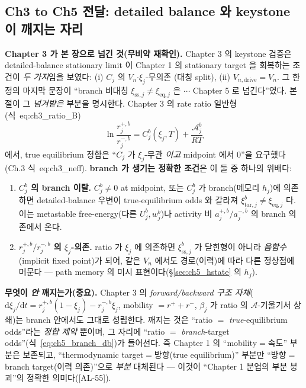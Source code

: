 \documentclass[11pt,a4paper]{article}
\newcommand{\dd}{\mathrm{d}}
\newcommand{\eq}{\mathrm{eq}}
\newcommand{\drive}{\mathrm{drive}}
\newcommand{\tar}{\mathrm{tar}}
\newcommand{\sstat}{\mathrm{ss}}
\newcommand{\AL}[1]{\textsf{[AL-#1]}}
\begin{document}
\subsection{Ch3 to Ch5 전달: detailed balance 와 keystone 이 깨지는 자리}\label{sec:ch5_dbbreak}
\textbf{Chapter 3 가 본 장으로 넘긴 것(무비약 재확인).} Chapter 3 의 keystone 검증은 detailed-balance stationary
limit 이 Chapter 1 의 stationary target 을 회복하는 조건이 \emph{두 가지}임을 보였다: (i) $C_j$ 의 $V_n$$\cdot$$\xi_j$-무의존
(대칭 split), (ii) $V_{n,\drive}=V_n$. 그 한정의 마지막 문장이 ``branch 비대칭 $\xi_{\sstat,j}\ne\xi_{\eq,j}$
은 $\cdots$ Chapter 5 로 넘긴다''였다. 본 절이 그 \emph{넘겨받은} 부분을 명시한다. Chapter 3 의 rate ratio
일반형(식~eq:ch3\_ratio\_B)
\begin{equation}
\ln\frac{r_j^{+,b}}{r_j^{-,b}}=C_j^b(\xi_j,T)+\frac{\mathcal A_j^b}{RT}
\label{eq:ch5_ratio_branch}
\end{equation}
에서, true equilibrium 정합은 ``$C_j$ 가 $\xi_j$-무관 \emph{이고} midpoint 에서 0''을 요구했다(Ch.3
식~eq:ch3\_neff). \textbf{branch 가 생기는 정확한 조건}은 이 둘 중 하나의 위배다:
\begin{enumerate}[label=(\alph*),leftmargin=2.2em]
\item \textbf{$C_j^b$ 의 branch 이탈.} $C_j^b\ne0$ at midpoint, 또는 $C_j^b$ 가 branch(메모리 $h_j$)에 의존하면
  detailed-balance 우변이 true-equilibrium odds 와 갈라져 $\xi_{\tar,j}^b\ne\xi_{\eq,j}$ 다. 이는 metastable
  free-energy(다른 $U_j^b,w_j^b$)나 activity 비 $a_j^{+,b}/a_j^{-,b}$ 의 branch 의존에서 온다.
\item \textbf{$r_j^{+,b}/r_j^{-,b}$ 의 $\xi_j$-의존.} ratio 가 $\xi_j$ 에 의존하면 $\xi_{\sstat,j}^b$ 가
  닫힌형이 아니라 \emph{음함수}(implicit fixed point)가 되어, 같은 $V_n$ 에서도 경로(이력)에 따라 다른 정상점에
  머문다 — path memory 의 미시 표현이다(\S\ref{sec:ch5_hstate} 의 $h_j$).
\end{enumerate}
\textbf{무엇이 \emph{안} 깨지는가(중요).} Chapter 3 의 \emph{forward/backward 구조 자체}($\dd\xi_j/\dd t=
r_j^{+,b}(1-\xi_j)-r_j^{-,b}\xi_j$, mobility $=r^++r^-$, $\beta_j$ 가 ratio 의 $\mathcal A$-기울기서 상쇄)는
branch 안에서도 그대로 성립한다. 깨지는 것은 ``ratio $=$ \emph{true}-equilibrium odds''라는 \emph{정합 제약}
뿐이며, 그 자리에 ``ratio $=$ \emph{branch}-target odds''(식~\eqref{eq:ch5_branch_db})가 들어선다. 즉 Chapter 1 의
``mobility$=$속도'' 부분은 보존되고, ``thermodynamic target$=$방향(true equilibrium)'' 부분만
``방향$=$branch target(이력 의존)''으로 \emph{부분} 대체된다 — 이것이 ``Chapter 1 분업의 부분 붕괴''의 정확한
의미다(\AL{55}).
\end{document}
